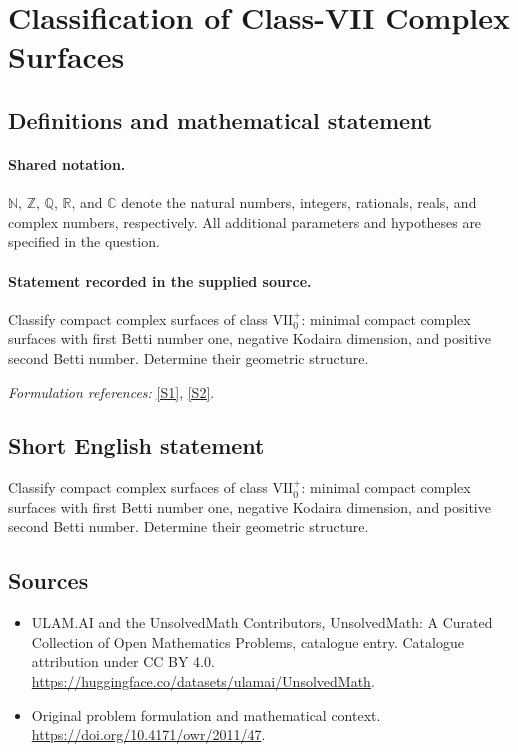 \documentclass[11pt]{article}
\newcommand{\sref}[2]{\hyperlink{source:#1:#2}{[S#2]}}
\begin{document}
\section{Classification of Class-VII Complex Surfaces}\label{statement}

\subsection{Definitions and mathematical statement}

\paragraph{Shared notation.}$\mathbb N$, $\mathbb Z$, $\mathbb Q$, $\mathbb R$, and $\mathbb C$ denote the natural numbers, integers, rationals, reals, and complex numbers, respectively. All additional parameters and hypotheses are specified in the question.


\paragraph{Statement recorded in the supplied source.}
Classify compact complex surfaces of class $\mathrm{VII}_0^+$: minimal compact complex surfaces with first Betti number one, negative Kodaira dimension, and positive second Betti number. Determine their geometric structure.
\par\smallskip\textit{Formulation references:} \sref{statement}{1}, \sref{statement}{2}.
\subsection{Short English statement}
Classify compact complex surfaces of class $\mathrm{VII}_0^+$: minimal compact complex surfaces with first Betti number one, negative Kodaira dimension, and positive second Betti number. Determine their geometric structure.
\subsection{Sources}
\begin{itemize}
\item[\hypertarget{source:statement:1}{S1}] ULAM.AI and the UnsolvedMath Contributors, UnsolvedMath: A Curated Collection of Open Mathematics Problems, catalogue entry. Catalogue attribution under CC BY 4.0.
\url{https://huggingface.co/datasets/ulamai/UnsolvedMath}.
\item[\hypertarget{source:statement:2}{S2}] Original problem formulation and mathematical context.
\url{https://doi.org/10.4171/owr/2011/47}.
\end{itemize}
\label{end:statement}
\end{document}
